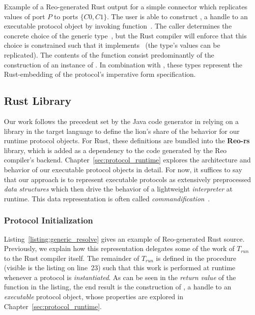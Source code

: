 \begin{listing}[ht]
	\centering
	\inputminted[]{rust}{generic_resolve.rs}
	\caption[Simple Reo compiler Rust output.]{Example of a Reo-generated Rust output for a simple connector which replicates values of port $P$ to ports $\{C0, C1\}$. The user is able to construct , a handle to an executable protocol object by invoking function~. The caller determines the concrete choice of the generic type~, but the Rust compiler will enforce that this choice is constrained such that it implements~ (the type's values can be replicated). The contents of the function consist predominantly of the construction of an instance of . In combination with , these types represent the Rust-embedding of the protocol's imperative form specification.}
	\label{listing:generic_resolve}
\end{listing}

\subsection{Rust Library}
\label{sec:translation_phase_2}
Our work follows the precedent set by the Java code generator in relying on a library in the target language to define the lion's share of the behavior for our runtime protocol objects. For Rust, these definitions are bundled into the \textbf{Reo-rs} library, which is added as a dependency to the code generated by the Reo compiler's backend. Chapter~\ref{sec:protocol_runtime} explores the architecture and behavior of our executable protocol objects in detail. For now, it suffices to say that our approach is to represent executable protocols as extensively preprocessed \textit{data structures} which then drive the behavior of a lightweight \textit{interpreter} at runtime. This data representation is often called \textit{commandification}~\cite{nystrom2014game}. 


\subsubsection{Protocol Initialization}
Listing~\ref{listing:generic_resolve} gives an example of Reo-generated Rust source. Previously, we explain how this representation delegates some of the work of $T_{run}$ to the Rust compiler itself. The remainder of $T_{run}$ is defined in the  procedure (visible is the listing on line~23) such that this work is performed at runtime whenever a protocol is \textit{instantiated}. As can be seen in the \textit{return value} of the function in the listing, the end result is the construction of , a handle to an \textit{executable} protocol object, whose properties are explored in Chapter~\ref{sec:protocol_runtime}.

